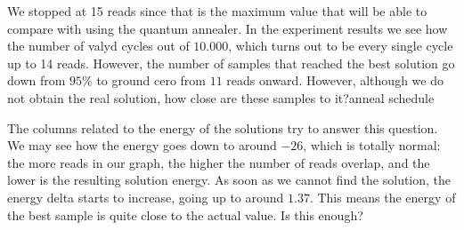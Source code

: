 \begin{table}[H]
	\centering
	\caption{Results of experiment 5, $10.000$ reads using the simulated annealer.}
	\label{tab:exp5_1}
\end{table}

We stopped at 15 reads since that is the maximum value that will be able to compare with using the quantum annealer. In the experiment results we see how the number of valyd cycles out of $10.000$, which turns out to be every single cycle up to 14 reads. However, the number of samples that reached the best solution go down from $95\%$ to ground cero from $11$ reads onward. However, although we do not obtain the real solution, how close are these samples to it?anneal schedule 

The columns related to the energy of the solutions try to answer this question. We may see how the energy goes down to around $-26$, which is totally normal: the more reads in our graph, the higher the number of reads overlap, and the lower is the resulting solution energy. As soon as we cannot find the solution, the energy delta starts to increase, going up to around $1.37$. This means the energy of the best sample is quite close to the actual value. Is this enough?

